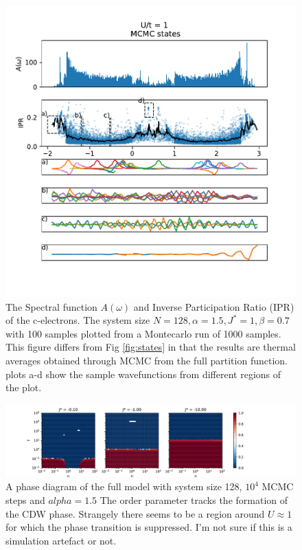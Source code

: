 \documentclass[a4paper, 11pt, onecolumn]{article}
\begin{document}
\begin{figure}
  \centering
    \includegraphics[width=\textwidth]{mcmc_States}
  \caption{The Spectral function $A(\omega)$ and Inverse Participation Ratio (IPR) of the c-electrons. The system size $N = 128, \alpha = 1.5, J^* = 1, \beta = 0.7$ with 100 samples plotted from a Montecarlo run of 1000 samples. This figure differs from Fig \ref{fig:states} in that the results are thermal averages obtained through MCMC from the full partition function. plots a-d show the sample wavefunctions from different regions of the plot.}
  \label{fig:mcmc_states}
\end{figure}

\begin{figure}
  \centering
    \includegraphics[width=\textwidth]{phase_diagram_4_log}
  \caption{A phase diagram of the full model with system size 128, $10^4$ MCMC steps and $alpha = 1.5$ The order parameter tracks the formation of the CDW phase. Strangely there seems to be a region around $U \approx 1$ for which the phase transition is suppressed. I'm not sure if this is a simulation artefact or not.}
  \label{fig:phase_diagram_4_log}
\end{figure}
\end{document}
